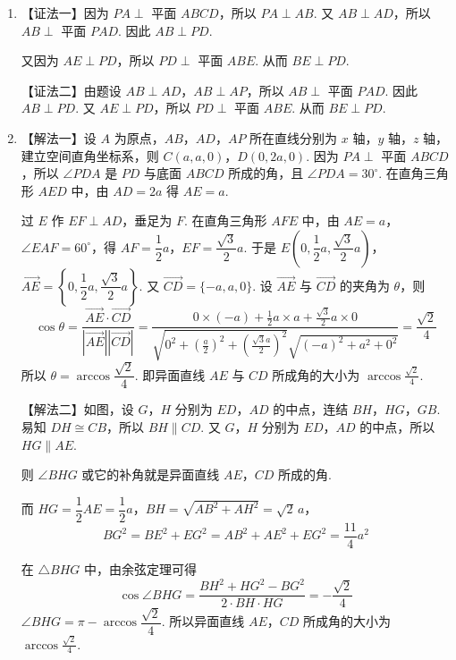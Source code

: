 \documentclass[UTF8,a4paper,oneside,11pt]{ctexbook}
\begin{document}
\begin{solution}
\begin{enumerate}
\item 【证法一】因为 \(PA\perp\) 平面 \(ABCD\)，所以 \(PA\perp AB\). 又 \(AB\perp AD\)，所以 \(AB\perp\) 平面 \(PAD\). 因此 \(AB\perp PD\).

又因为 \(AE\perp PD\)，所以 \(PD\perp\) 平面 \(ABE\). 从而 \(BE\perp PD\).

【证法二】由题设 \(AB\perp AD\)，\(AB\perp AP\)，所以 \(AB\perp\) 平面 \(PAD\). 因此 \(AB\perp PD\). 又 \(AE\perp PD\)，所以 \(PD\perp\) 平面 \(ABE\). 从而 \(BE\perp PD\).

\item 【解法一】设 \(A\) 为原点，\(AB\)，\(AD\)，\(AP\) 所在直线分别为 \(x\) 轴，\(y\) 轴，\(z\) 轴，建立空间直角坐标系，则 \(C(a,a,0)\)，\(D(0,2a,0)\).
因为 \(PA\perp\) 平面 \(ABCD\)，所以 \(\angle PDA\) 是 \(PD\) 与底面 \(ABCD\) 所成的角，且 \(\angle PDA=30^\circ\). 在直角三角形 \(AED\) 中，由 \(AD=2a\) 得 \(AE=a\).

过 \(E\) 作 \(EF\perp AD\)，垂足为 \(F\). 在直角三角形 \(AFE\) 中，由 \(AE=a\)，\(\angle EAF=60^\circ\)，得 \(AF=\dfrac12a\)，\(EF=\dfrac{\sqrt3}{2}a\).
于是 \(E\left(0,\dfrac12a,\dfrac{\sqrt3}{2}a\right)\)，\(\overrightarrow{AE}=\left\{0,\dfrac12a,\dfrac{\sqrt3}{2}a\right\}\). 又 \(\overrightarrow{CD}=\{-a,a,0\}\).
设 \(\overrightarrow{AE}\) 与 \(\overrightarrow{CD}\) 的夹角为 \(\theta\)，则
\[
\cos\theta=\frac{\overrightarrow{AE}\cdot\overrightarrow{CD}}{\left|\overrightarrow{AE}\right|\left|\overrightarrow{CD}\right|}
=\frac{0\times(-a)+\frac12a\times a+\frac{\sqrt3}{2}a\times0}{\sqrt{0^2+\left(\frac a2\right)^2+\left(\frac{\sqrt3 a}{2}\right)^2}\sqrt{(-a)^2+a^2+0^2}}
=\frac{\sqrt2}{4}
\]
所以 \(\theta=\arccos\dfrac{\sqrt2}{4}\).
即异面直线 \(AE\) 与 \(CD\) 所成角的大小为 \(\arccos\frac{\sqrt2}{4}\).

【解法二】如图，设 \(G\)，\(H\) 分别为 \(ED\)，\(AD\) 的中点，连结 \(BH\)，\(HG\)，\(GB\). 易知 \(DH \cong CB\)，所以 \(BH\parallel CD\). 又 \(G\)，\(H\) 分别为 \(ED\)，\(AD\) 的中点，所以 \(HG\parallel AE\).

则 \(\angle BHG\) 或它的补角就是异面直线 \(AE\)，\(CD\) 所成的角.

而 \(HG=\dfrac12 AE=\dfrac12 a\)，\(BH=\sqrt{AB^2+AH^2}=\sqrt2\,a\)，
\[
BG^2=BE^2+EG^2=AB^2+AE^2+EG^2=\dfrac{11}{4}a^2
\]

在 \(\triangle BHG\) 中，由余弦定理可得
\[
\cos\angle BHG=\frac{BH^2+HG^2-BG^2}{2\cdot BH\cdot HG}=-\frac{\sqrt2}{4}
\]
\(\angle BHG=\pi-\arccos\dfrac{\sqrt2}{4}\).
所以异面直线 \(AE\)，\(CD\) 所成角的大小为 \(\arccos\frac{\sqrt2}{4}\).
\end{enumerate}
\end{solution}
\end{document}
